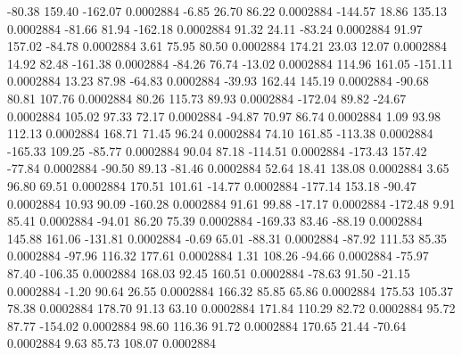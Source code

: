      -80.38      159.40     -162.07     0.0002884
       -6.85       26.70       86.22     0.0002884
     -144.57       18.86      135.13     0.0002884
      -81.66       81.94     -162.18     0.0002884
       91.32       24.11      -83.24     0.0002884
       91.97      157.02      -84.78     0.0002884
        3.61       75.95       80.50     0.0002884
      174.21       23.03       12.07     0.0002884
       14.92       82.48     -161.38     0.0002884
      -84.26       76.74      -13.02     0.0002884
      114.96      161.05     -151.11     0.0002884
       13.23       87.98      -64.83     0.0002884
      -39.93      162.44      145.19     0.0002884
      -90.68       80.81      107.76     0.0002884
       80.26      115.73       89.93     0.0002884
     -172.04       89.82      -24.67     0.0002884
      105.02       97.33       72.17     0.0002884
      -94.87       70.97       86.74     0.0002884
        1.09       93.98      112.13     0.0002884
      168.71       71.45       96.24     0.0002884
       74.10      161.85     -113.38     0.0002884
     -165.33      109.25      -85.77     0.0002884
       90.04       87.18     -114.51     0.0002884
     -173.43      157.42      -77.84     0.0002884
      -90.50       89.13      -81.46     0.0002884
       52.64       18.41      138.08     0.0002884
        3.65       96.80       69.51     0.0002884
      170.51      101.61      -14.77     0.0002884
     -177.14      153.18      -90.47     0.0002884
       10.93       90.09     -160.28     0.0002884
       91.61       99.88      -17.17     0.0002884
     -172.48        9.91       85.41     0.0002884
      -94.01       86.20       75.39     0.0002884
     -169.33       83.46      -88.19     0.0002884
      145.88      161.06     -131.81     0.0002884
       -0.69       65.01      -88.31     0.0002884
      -87.92      111.53       85.35     0.0002884
      -97.96      116.32      177.61     0.0002884
        1.31      108.26      -94.66     0.0002884
      -75.97       87.40     -106.35     0.0002884
      168.03       92.45      160.51     0.0002884
      -78.63       91.50      -21.15     0.0002884
       -1.20       90.64       26.55     0.0002884
      166.32       85.85       65.86     0.0002884
      175.53      105.37       78.38     0.0002884
      178.70       91.13       63.10     0.0002884
      171.84      110.29       82.72     0.0002884
       95.72       87.77     -154.02     0.0002884
       98.60      116.36       91.72     0.0002884
      170.65       21.44      -70.64     0.0002884
        9.63       85.73      108.07     0.0002884
